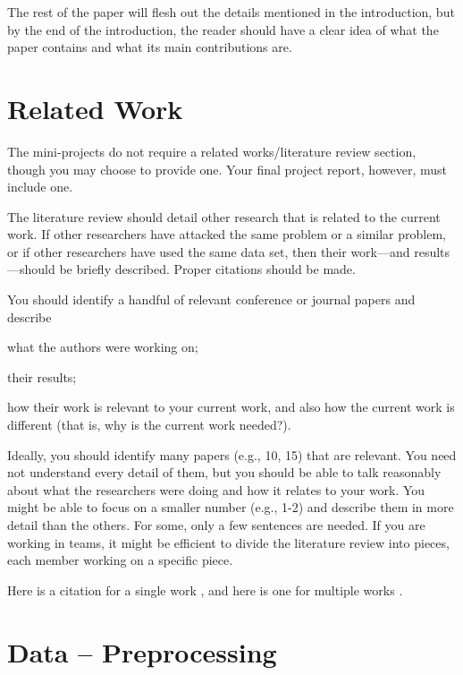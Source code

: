 \documentclass[jair,twoside,11pt,theapa]{article}
\begin{document}
The rest of the paper will flesh out the details mentioned in the introduction, but by the end of the introduction, the reader should have a clear idea of what the paper contains and what its main contributions are.


\section{Related Work}
\label{related}

The mini-projects do not require a related works/literature review section, though you may choose to provide one. Your final project report, however, must include one.

The literature review should detail other research that is related to the current work. If other researchers have attacked the same problem or a similar problem, or if other researchers have used the same data set, then their work---and results---should be briefly described. Proper citations should be made.

You should identify a handful of relevant conference or journal papers and describe

{\color{blue}
\begin{compactenum}
\item	what the authors were working on;
\item	their results;
\item	how their work is relevant to your current work, and also how the current work is different (that is, why is the current work needed?).
\end{compactenum}}


Ideally, you should identify many papers (e.g., 10, 15) that are relevant. You need not understand every detail of them, but you should be able to talk reasonably about what the researchers were doing and how it relates to your work. You might be able to focus on a smaller number (e.g., 1-2) and describe them in more detail than the others. For some, only a few sentences are needed.
If you are working in teams, it might be efficient to divide the literature review into pieces, each member working on a specific piece.

Here is a citation for a single work \cite{papad}, and here is one for multiple works \cite{simmons-aaai88,hacker}.

\section{Data -- Preprocessing }
\label{preprocessing}
\end{document}
